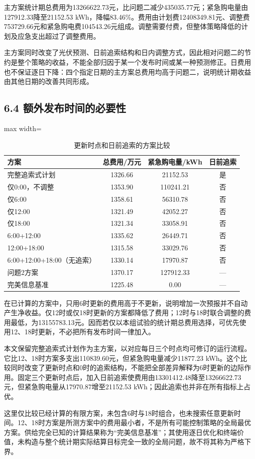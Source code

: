 \documentclass[UTF8,a4paper,zihao=-4,fontset=windows]{ctexart}
\begin{document}
主方案统计期总费用为13266622.73元，比问题二减少435035.77元；紧急购电量由127912.33降至21152.53 kWh，降幅83.46\%。费用由计划费12408349.81元、调整费753729.66元和紧急购电费104543.26元组成。调整需要付费，但整体策略降低的计划及应急支出超过了调整费用。
\par
主方案同时改变了光伏预测、日前追索结构和日内调整方式，因此相对问题二的节约是整个策略的收益，不能全部归因于某一个发布时间或某一种预测修正。日费用也不保证逐日下降：四个指定日期的主方案总费用均高于问题二，说明统计期收益由其他日期的改善共同形成。
\par
\subsection{6.4 额外发布时间的必要性}
\begin{table}[H]\centering\caption{更新时点和日前追索的方案比较}
\fontsize{9.5}{12}\selectfont\setlength{\tabcolsep}{4pt}\renewcommand{\arraystretch}{1.12}
\begin{adjustbox}{max width=\linewidth}\begin{tabular}{lccc}\toprule
方案 & 总费用/万元 & 紧急购电量/kWh & 日前追索\\\midrule
完整追索式计划 & 1326.66 & 21152.53 & 是\\
仅0:00，不调整 & 1353.90 & 110241.21 & 否\\
仅6:00 & 1358.61 & 56310.78 & 否\\
仅12:00 & 1321.49 & 42052.27 & 否\\
仅18:00 & 1321.34 & 33058.91 & 否\\
6:00+12:00 & 1335.62 & 26449.71 & 否\\
12:00+18:00 & 1315.58 & 33029.76 & 否\\
6:00+12:00+18:00（无追索） & 1330.14 & 17970.87 & 否\\
问题2方案 & 1370.17 & 127912.33 & —\\
完美信息基准 & 1225.48 & 0.00 & —\\
\bottomrule\end{tabular}\end{adjustbox}\end{table}
在已计算的方案中，只用6时更新的费用高于不更新，说明增加一次预报并不自动产生净收益。仅12时或仅18时更新的方案都降低了费用；12时与18时联合调整的费用最低，为13155783.13元。因而若仅以本组试验的统计期总费用选择，可优先使用12、18时更新，不必把所有发布时间一律加入。
\par
本文保留完整追索式计划作为主方案，以对应每日三个时点均可修订的运行流程。它比12、18时方案多支出110839.60元，但紧急购电量减少11877.23 kWh。这个比较同时改变了更新时点和0时的追索结构，不能把全部差异解释为6时更新的边际作用。固定三个更新时点后，加入日前追索使费用由13301412.48降至13266622.73元，但紧急购电量从17970.87增至21152.53 kWh；因此追索也并非在所有指标上占优。
\par
这里仅比较已经计算的有限方案，未包含6时与18时组合，也未搜索任意更新时间。12、18时方案是所测方案中的费用最小者，不是所有可能控制策略的全局最优方案。供给完全已知的计算结果称为“完美信息基准”；其使用逐日优化和终端价值，未构造与整个统计期实际结算目标完全一致的全局问题，故不将其称为严格下界。
\par
\end{document}
